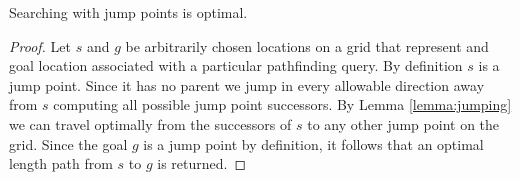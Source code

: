 

\begin{theorem}
\label{theorem:jumpoptimal}
Searching with jump points is optimal.
\end{theorem}
\begin{proof}
Let $s$ and $g$ be arbitrarily chosen locations on a grid that represent
and goal location associated with a particular pathfinding query.
By definition $s$ is a jump point. Since it has no parent we jump in every 
allowable direction away from $s$ computing all possible jump point successors.
By Lemma \ref{lemma:jumping} we can travel optimally from the
successors of $s$ to any other jump point on the grid.
Since the goal $g$ is a jump point by definition, it follows that an optimal
length path from $s$ to $g$ is returned.
\end{proof}

